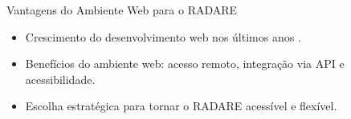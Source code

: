 \begin{frame}{Vantagens do Ambiente Web para o RADARE}
    \begin{itemize}
        \item Crescimento do desenvolvimento web nos últimos anos \cite{webusage}.
        \item Benefícios do ambiente web: acesso remoto, integração via API e acessibilidade.
        \item Escolha estratégica para tornar o RADARE acessível e flexível.
    \end{itemize}
\end{frame}

